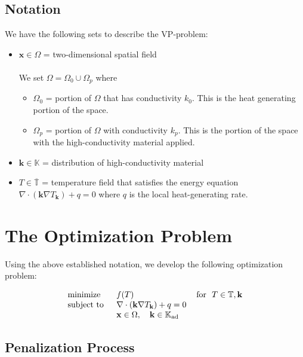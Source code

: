 \documentclass[11pt]{article}
\begin{document}
\subsection*{Notation}

We have the following sets to describe the VP-problem:

\begin{itemize}
	\item $\mathbf{x}\in\Omega$ = two-dimensional spatial field\\\\
	We set $\Omega = \Omega_0\cup\Omega_p$ where
	\begin{itemize}
		\item $\Omega_0$ = portion of $\Omega$ that has conductivity $k_0$. This is the heat generating portion of the space.
		\item $\Omega_p$ = portion of $\Omega$ with conductivity $k_p$. This is the portion of the space with the high-conductivity material applied.
	\end{itemize}
	\item $\mathbf{k}\in\mathbb{K}$ = distribution of high-conductivity material
	\item $T\in\overline{\mathbb{T}}$ = temperature field that satisfies the energy equation {\color{baystate}$\nabla\cdot\left(\mathbf{k}\nabla T_{\mathbf{k}}\right)+q=0$} where $q$ is the local heat-generating rate.
\end{itemize}

\section*{The Optimization Problem}

Using the above established notation, we develop the following optimization problem:

{\color{baystate}
	\begin{equation}
		\begin{tabular}{lll}
			\text{minimize }   & $f(T)$ & \text{for } $T\in\mathbb{T},\mathbf{k}$      \\
			\text{subject to } & $\nabla\cdot\left(\mathbf{k}\nabla T_{\mathbf{k}}\right)+q=0$ & \\
			& $\mathbf{x}\in\Omega,\quad\mathbf{k}\in\mathbb{K}_{\text{ad}}$&      
		\end{tabular}\label{SIMP-Optimization-Problem}
	\end{equation}
}

\subsection*{Penalization Process}



\nocite{Boyd2004}
\nocite{Gander2018}
\nocite{dawkins_2018}
\nocite{enwiki:1011407395}
\nocite{Shewchuk1994}
\nocite{Svanberg1987}
\nocite{Marck2012}
\end{document}
